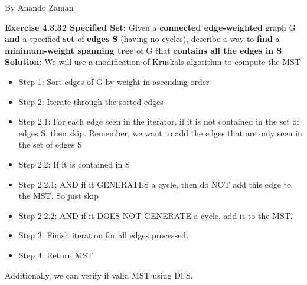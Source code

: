 \documentclass[11pt,fleqn]{article}
\begin{document}
By Anando Zaman


\textbf{Exercise 4.3.32 Specified Set:} Given a \textbf{connected edge-weighted} graph G \textbf{and} a specified \textbf{set} of
\textbf{edges S} (having no cycles), describe a way to \textbf{find} a \textbf{minimum-weight spanning tree} of
G that \textbf{contains all the edges in S}.\\

\textbf{Solution:} We will use a modification of Kruskals algorithm to compute the MST

\begin{itemize}
	\item Step 1: Sort edges of G by weight in ascending order
	\item Step 2: Iterate through the sorted edges
	\item Step 2.1: For each edge seen in the iterator, if it is not contained in the set of edges S, then skip. Remember, we want to add the edges that are only seen in the set of edges S
	\item Step 2.2: If it is contained in S
	\item Step 2.2.1: AND if it GENERATES a cycle, then do NOT add this edge to the MST. So just skip
	\item Step 2.2.2: AND if it DOES NOT GENERATE a cycle, add it to the MST.
	\item Step 3: Finish iteration for all edges processed.
	\item Step 4: Return MST
\end{itemize}

Additionally, we can verify if valid MST using DFS.
\end{document}
